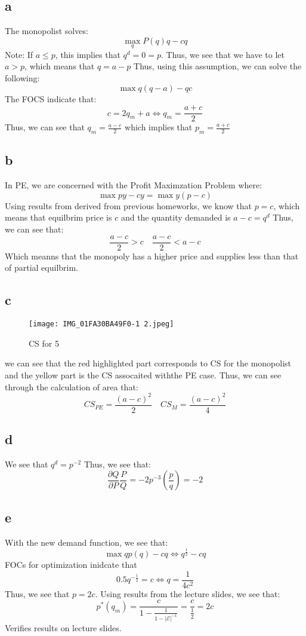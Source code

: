 \documentclass[11pt]{article}
\begin{document}
\section{}
\subsection*{a}
The monopolist solves:
\[
\max_q P(q) q - c q
\]
Note: If $a \leq p$, this implies that $q^d = 0 = p$. Thus, we see that we have to let $a > p$, which means that $ q = a - p$ Thus, using this assumption, we can solve the following:
\[
\max q(q - a) - qc
\]
The FOCS indicate that:
\[
c = 2q _m+ a \iff q_m = \frac{a+c}{2}
\]
Thus, we can see that $q_m = \frac{a-c}{2}$ which implies that $p_m = \frac{a+c}{2}$ 
\subsection*{b}
In PE, we are concerned with the Profit Maximzation Problem where:
\[
\max py - cy  = \max y(p -c)
\]
Using results from derived from previous homeworks, we know that $p = c$, which means that equilbrim price is $c$ and the quantity demanded is $a -c = q^d$ Thus, we can see that:
\[
\frac{a-c}{2} > c \quad \frac{a-c}{2} < a-c
\]
Which meanns that the monopoly has a higher price and supplies less than that of partial equilbrim. 
\subsection*{c}
\begin{figure}[H]
    \centering
    \texttt{[image: IMG\_01FA30BA49F0-1 2.jpeg]}
    \caption{CS for 5}
    \label{fig:enter-2abel}
\end{figure}
we can see that the red highlighted part corresponds to CS for the monopolist and the yellow part is the CS assocaited withthe PE case. Thus, we can see through the calculation of area that:
\[
CS_{PE} = \frac{(a-c)^2}{2} \quad CS_M = \frac{(a-c)^2}{4}
\]
\subsection*{d}
We see that $q^d = p^{-2}$
Thus, we see that:
\[
\frac{\partial Q}{\partial P} \frac{P}{Q} = -2p^{-3} \left( \frac{p}{q} \right) = -2
\]
\subsection*{e}
With the new demand function, we see that:
\[
\max q p(q) - cq \iff q^\frac{1}{2} -cq 
\]
FOCs for optimization inidcate that
\[
0.5q^{-\frac{1}{2}} = c \iff q = \frac{1}{4c^2}
\]
Thus, we see that $p = 2c$. Using results from the lecture slides, we see that:
\[
p^*(q_m) = \frac{c}{1 - \frac{1}{1 -|\mathcal{E}|^{-1}}} = \frac{c}{\frac{1}{2}} = 2c
\]
Verifies results on lecture slides. 
\end{document}
